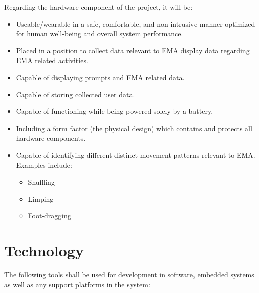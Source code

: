 \documentclass[12pt]{article}
\begin{document}
Regarding the hardware component of the project, it will be:\\

\begin{itemize}
\item Useable/wearable in a safe, comfortable, and non-intrusive manner optimized for human well-being and overall system performance.
\item Placed in a position to collect data relevant to EMA display data regarding EMA related activities.
\item Capable of displaying prompts and EMA related data.
\item Capable of storing collected user data.
\item Capable of functioning while being powered solely by a battery.
\item Including a form factor (the physical design) which contains and protects all hardware components.
\item Capable of identifying different distinct movement patterns relevant to EMA. Examples include:
\begin{itemize}
\item Shuffling
\item Limping
\item Foot-dragging
\end{itemize}
\end{itemize}

\section{Technology}
The following tools shall be used for development in software, embedded systems as well as any support platforms in the system:
\end{document}
